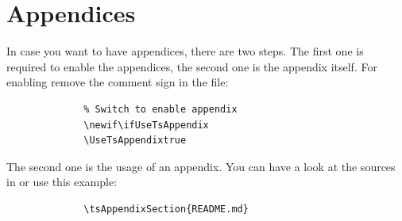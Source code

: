
\section{Appendices}

In case you want to have appendices, there are two steps. The first one is
required to enable the appendices, the second one is the appendix itself.
For enabling remove the comment sign in the 
file:

\begin{figure}[H]
    \small
    \centering
    \begin{BVerbatim}
        % Switch to enable appendix
        \newif\ifUseTsAppendix
        \UseTsAppendixtrue
    \end{BVerbatim}
\end{figure}

The second one is the usage of an appendix. You can have a look at the sources
in  or use this example:

\begin{figure}[H]
    \small
    \centering
    \begin{BVerbatim}
        \tsAppendixSection{README.md}
    \end{BVerbatim}
\end{figure}

